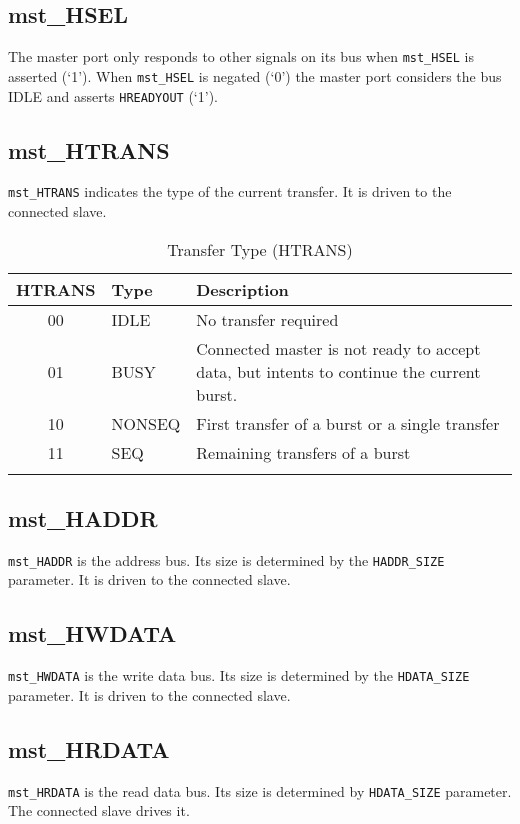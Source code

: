 \subsection{mst\_HSEL}\label{mst_hsel}

The master port only responds to other signals on its bus when \texttt{mst\_HSEL} is
asserted (`1'). When \texttt{mst\_HSEL} is negated (`0') the master port
considers the bus IDLE and asserts \texttt{HREADYOUT} (`1').

\subsection{mst\_HTRANS}\label{mst_htrans}

\texttt{mst\_HTRANS} indicates the type of the current transfer. It is driven to
the connected slave.

\begin{longtable}[]{@{}clp{9cm}@{}}
\toprule
HTRANS & Type & Description\tabularnewline
\midrule
\endhead
00 & IDLE & No transfer required\tabularnewline
01 & BUSY & Connected master is not ready to accept data, but intents to
continue the current burst.\tabularnewline
10 & NONSEQ & First transfer of a burst or a single
transfer\tabularnewline
11 & SEQ & Remaining transfers of a burst\tabularnewline
\bottomrule
\caption{Transfer Type (HTRANS)}
\end{longtable}


\subsection{mst\_HADDR}\label{mst_haddr}

\texttt{mst\_HADDR} is the address bus. Its size is determined by the \texttt{HADDR\_SIZE}
parameter. It is driven to the connected slave.

\subsection{mst\_HWDATA}\label{mst_hwdata}

\texttt{mst\_HWDATA} is the write data bus. Its size is determined by the
\texttt{HDATA\_SIZE} parameter. It is driven to the connected slave.

\subsection{mst\_HRDATA}\label{mst_hrdata}

\texttt{mst\_HRDATA} is the read data bus. Its size is determined by \texttt{HDATA\_SIZE}
parameter. The connected slave drives it.

